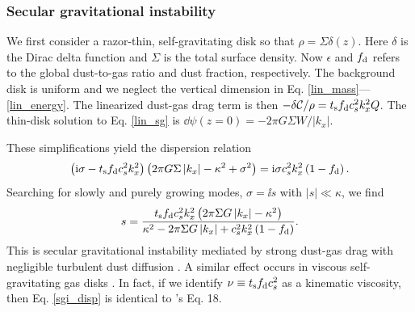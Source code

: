  




\subsubsection{Secular gravitational instability}\label{sgi}
We first consider a razor-thin, self-gravitating disk so that $\rho =
\Sigma\delta(z)$. Here $\delta$ is the Dirac delta function and $\Sigma$ is
the total surface density. Now $\epsilon$ and 
$f_\mathrm{d}$ refers to the global dust-to-gas ratio and dust 
fraction, respectively. The background disk is
uniform and we neglect the vertical dimension   
in Eq. \ref{lin_mass}---\ref{lin_energy}. The linearized dust-gas drag
term is then $-\delta\mathcal{C}/\rho = t_\mathrm{s}f_\mathrm{d} c_s^2k_x^2
Q$. The thin-disk solution to Eq. \ref{lin_sg} is $\dd\psi(z=0) = -2\pi G
\Sigma W/\left|k_x\right|$.%

These simplifications yield the dispersion relation
\begin{align*}
  \left(\mathrm{i}\sigma - t_\mathrm{s}f_\mathrm{d} c_s^2k_x^2\right)\left( 2 \pi G
    \Sigma \left|k_x\right|  - \kappa^2 + \sigma^2 \right) = \mathrm{i}
  \sigma c_s^2 k_x^2\left(1 - f_\mathrm{d}\right). 
\end{align*}
Searching for slowly and purely growing modes, $\sigma = \ii s$ with 
$|s|\ll \kappa$, we find 
\begin{align}  
s = \frac{t_\mathrm{s}f_\mathrm{d} c_s^2 k_x^2 \left( 2 \pi \Sigma G
    \left|k_x\right| - \kappa^2\right)}{\kappa^2 -2 \pi \Sigma G
    \left|k_x\right| + c_s^2k_x^2\left(1-f_\mathrm{d}\right) }. \label{sgi_disp}
\end{align}
This is secular gravitational instability mediated by strong
dust-gas drag with negligible turbulent dust diffusion 
\citep[][ their Eq. 13 becomes our Eq. \ref{sgi_disp} in this limit
after 
a change of variables]{takahashi14}. A similar effect occurs in viscous
self-gravitating gas disks \citep{gammie96,lin16}. In fact, if we
identify $\nu \equiv t_\mathrm{s} f_\mathrm{d} c_s^2$ as a kinematic viscosity,
then Eq. \ref{sgi_disp} is identical to \citeauthor{gammie96}'s Eq. 18. 

